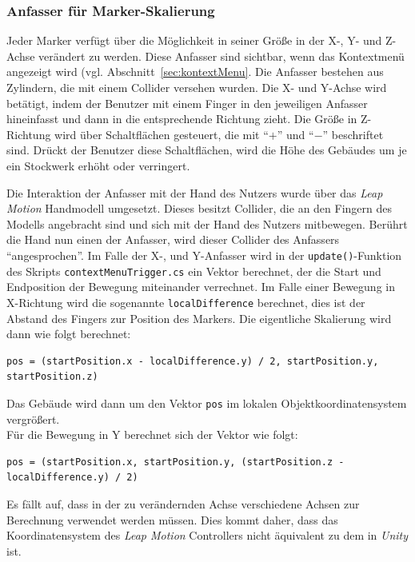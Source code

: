\subsubsection{Anfasser für Marker-Skalierung}\label{sec:markerHandles}
Jeder Marker verfügt über die Möglichkeit in seiner Größe in der X-, Y- und Z-Achse verändert zu werden. Diese Anfasser sind sichtbar, wenn das Kontextmenü angezeigt wird (vgl. Abschnitt~\ref{sec:kontextMenu}. Die Anfasser bestehen aus Zylindern, die mit einem Collider versehen wurden. Die X- und Y-Achse wird betätigt, indem der Benutzer mit einem Finger in den jeweiligen Anfasser hineinfasst und dann in die entsprechende Richtung zieht. Die Größe in Z-Richtung wird über Schaltflächen gesteuert, die mit "`$+$"' und "`$-$"' beschriftet sind. Drückt der Benutzer diese Schaltflächen, wird die Höhe des Gebäudes um je ein Stockwerk erhöht oder verringert.

Die Interaktion der Anfasser mit der Hand des Nutzers wurde über das \emph{Leap Motion} Handmodell umgesetzt. Dieses besitzt Collider, die an den Fingern des Modells angebracht sind und sich mit der Hand des Nutzers mitbewegen. Berührt die Hand nun einen der Anfasser, wird dieser Collider des Anfassers "`angesprochen"'. Im Falle der X-, und Y-Anfasser wird in der \texttt{update()}-Funktion des Skripts \texttt{contextMenuTrigger.cs} ein Vektor berechnet, der die Start und Endposition der Bewegung miteinander verrechnet. Im Falle einer Bewegung in X-Richtung wird die sogenannte \texttt{localDifference} berechnet, dies ist der Abstand des Fingers zur Position des Markers. Die eigentliche Skalierung wird dann wie folgt berechnet:

 \begin{lstlisting}
pos = (startPosition.x - localDifference.y) / 2, startPosition.y, startPosition.z)
 \end{lstlisting}

Das Gebäude wird dann um den Vektor \texttt{pos} im lokalen Objektkoordinatensystem vergrößert.\\
Für die Bewegung in Y berechnet sich der Vektor wie folgt:

 \begin{lstlisting}
pos = (startPosition.x, startPosition.y, (startPosition.z - localDifference.y) / 2)
 \end{lstlisting}

Es fällt auf, dass in der zu verändernden Achse verschiedene Achsen zur Berechnung verwendet werden müssen. Dies kommt daher, dass das Koordinatensystem des \emph{Leap Motion} Controllers nicht äquivalent zu dem in \emph{Unity} ist.\\


